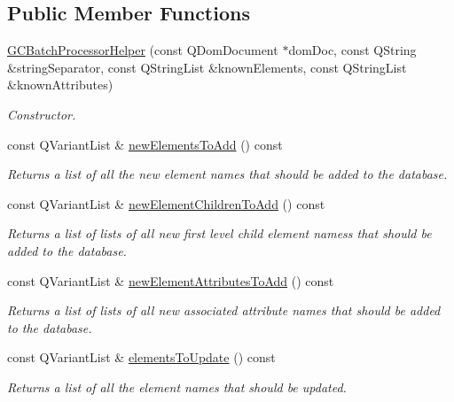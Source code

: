 \subsection*{\-Public \-Member \-Functions}
\begin{DoxyCompactItemize}
\item 
\hyperlink{class_g_c_batch_processor_helper_a36b76739cc2d64ab72e9d9b68425a7f1}{\-G\-C\-Batch\-Processor\-Helper} (const \-Q\-Dom\-Document $\ast$dom\-Doc, const \-Q\-String \&string\-Separator, const \-Q\-String\-List \&known\-Elements, const \-Q\-String\-List \&known\-Attributes)
\begin{DoxyCompactList}\small\item\em \-Constructor. \end{DoxyCompactList}\item 
const \-Q\-Variant\-List \& \hyperlink{class_g_c_batch_processor_helper_afdedbc674698c019ebd2a3938a239661}{new\-Elements\-To\-Add} () const 
\begin{DoxyCompactList}\small\item\em \-Returns a list of all the new element names that should be added to the database. \end{DoxyCompactList}\item 
const \-Q\-Variant\-List \& \hyperlink{class_g_c_batch_processor_helper_a89c14c3740c7cb57c937ef8db99b4af1}{new\-Element\-Children\-To\-Add} () const 
\begin{DoxyCompactList}\small\item\em \-Returns a list of lists of all new first level child element namess that should be added to the database. \end{DoxyCompactList}\item 
const \-Q\-Variant\-List \& \hyperlink{class_g_c_batch_processor_helper_a640ca9bd78b7da0796fdfb82fefce8b6}{new\-Element\-Attributes\-To\-Add} () const 
\begin{DoxyCompactList}\small\item\em \-Returns a list of lists of all new associated attribute names that should be added to the database. \end{DoxyCompactList}\item 
const \-Q\-Variant\-List \& \hyperlink{class_g_c_batch_processor_helper_aca0a2d6bbfcb23907e917b5d2251fc6f}{elements\-To\-Update} () const 
\begin{DoxyCompactList}\small\item\em \-Returns a list of all the element names that should be updated. \end{DoxyCompactList}\item 

\end{DoxyCompactItemize}
